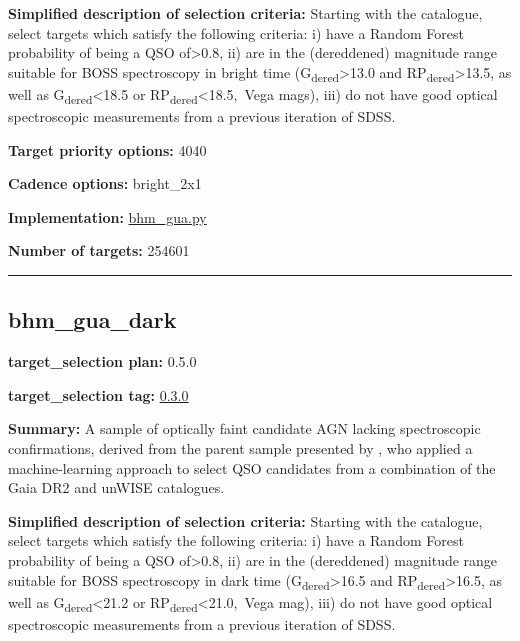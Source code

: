 \noindent\textbf{Simplified description of selection criteria:} Starting with the
\citet{Shu2019} catalogue, select targets which satisfy the following
criteria: i) have a Random Forest probability of being a QSO
of\textgreater0.8, ii) are in the (dereddened) magnitude range suitable
for BOSS spectroscopy in bright time
(G\textsubscript{dered}\textgreater13.0 and
RP\textsubscript{dered}\textgreater13.5, as well as
G\textsubscript{dered}\textless18.5 or
RP\textsubscript{dered}\textless18.5,~Vega mags), iii) do not have good
optical spectroscopic measurements from a previous iteration of SDSS.


\noindent\textbf{Target priority options:} 4040

\noindent\textbf{Cadence options:} bright\_2x1

\noindent\textbf{Implementation:}
\href{https://github.com/sdss/target_selection/blob/0.3.0/python/target_selection/cartons/bhm_gua.py}{bhm\_gua.py}

\noindent\textbf{Number of targets:} 254601

\begin{center}\rule{0.5\linewidth}{0.5pt}\end{center}

\hypertarget{bhm_gua_dark_plan0.5.0}{%
\subsection{bhm\_gua\_dark}\label{bhm_gua_dark_plan0.5.0}}

\noindent\textbf{target\_selection plan:} 0.5.0

\noindent\textbf{target\_selection tag:}
\href{https://github.com/sdss/target_selection/tree/0.3.0/}{0.3.0}

\noindent\textbf{Summary:} A sample of optically faint candidate AGN lacking
spectroscopic confirmations, derived from the parent sample presented by
\citet{Shu2019}, who applied a machine-learning approach to select QSO
candidates from a combination of the Gaia DR2 and unWISE catalogues.

\noindent\textbf{Simplified description of selection criteria:} Starting with the
\citet{Shu2019} catalogue, select targets which satisfy the following
criteria: i) have a Random Forest probability of being a QSO
of\textgreater0.8, ii) are in the (dereddened) magnitude range suitable
for BOSS spectroscopy in dark time
(G\textsubscript{dered}\textgreater16.5 and
RP\textsubscript{dered}\textgreater16.5, as well as
G\textsubscript{dered}\textless21.2 or
RP\textsubscript{dered}\textless21.0,~Vega mag), iii) do not have good
optical spectroscopic measurements from a previous iteration of SDSS.


